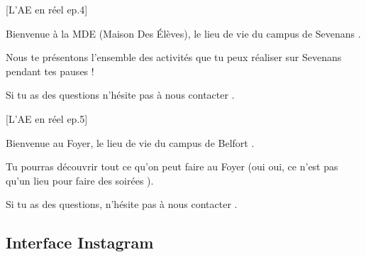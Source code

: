 [L'\gls{AE} en réel ep.4]

Bienvenue à la MDE (Maison Des Élèves), le lieu de vie du campus de Sevenans .

Nous te présentons l'ensemble des activités que tu peux réaliser sur Sevenans pendant tes pauses  !

Si tu as des questions n'hésite pas à nous contacter .

[L'\gls{AE} en réel ep.5]

Bienvenue au Foyer, le lieu de vie du campus de Belfort .

Tu pourras découvrir tout ce qu'on peut faire au Foyer  (oui oui, ce n'est pas qu'un lieu pour faire des soirées ).

Si tu as des questions, n'hésite pas à nous contacter .


\newpage

\subsection*{Interface Instagram}\label{subsec:interface-instagram}

